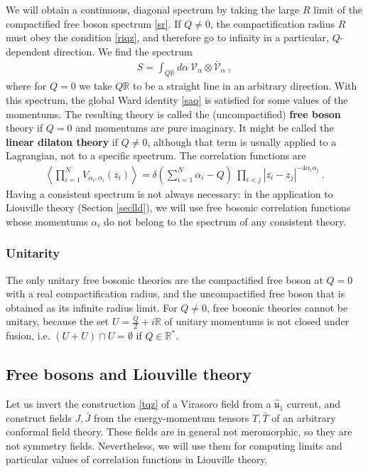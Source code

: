 \documentclass[12pt, a4paper, notitlepage, twoside]{report}
\numberwithin{equation}{section}
\theoremstyle{break}
\begin{document}
We will obtain a continuous, diagonal spectrum by taking 
the large $R$ limit of the compactified free boson spectrum \eqref{sr}.
If $Q\neq 0$, the compactification radius $R$ must obey the condition \eqref{riqz}, and therefore go to infinity in a particular, $Q$-dependent direction. We find the spectrum 
\begin{align}
 \boxed{ S = \int_{Q\mathbb{R}} d\alpha\ \mathcal{V}_\alpha\otimes \bar{\mathcal{V}}_\alpha}\ ,
\end{align}
where for $Q=0$ we take $Q\mathbb{R}$ to be a straight line in an arbitrary direction.  
With this spectrum, the global Ward identity \eqref{saq} is satisfied for some values of the momentums. 
The resulting theory is called the (uncompactified) \textbf{\boldmath free boson} theory if $Q=0$ and momentums are pure imaginary. It might be called the \textbf{\boldmath linear dilaton theory} if $Q\neq 0$, although that term is usually applied to a Lagrangian, not to a specific spectrum. 
The correlation functions are 
\begin{align}
 \left\langle \prod_{i=1}^N V_{\alpha_i,\alpha_i}(z_i)\right\rangle = \delta\left({\textstyle \sum}_{i=1}^N\alpha_i-Q\right)\ \prod_{i<j} |z_i-z_j|^{-4\alpha_i\alpha_j} \ .
\label{dpzz}
\end{align}
Having a consistent spectrum is not always necessary: in the application to Liouville theory (Section \ref{seclld}), we will use free bosonic correlation functions whose momentums $\alpha_i$ do not belong to the spectrum of any consistent theory.

\subsubsection{Unitarity}

The only unitary free bosonic theories are the compactified free boson at $Q=0$ with a real compactification radius, and the uncompactified free boson that is obtained as its infinite radius limit. For $Q\neq 0$, free bosonic theories cannot be unitary, because the set $U=\frac{Q}{2}+i\mathbb{R}$ of unitary momentums is not closed under fusion, i.e. $(U+U)\cap U = \emptyset$ if $Q\in \mathbb{R}^*$.


\subsection{Free bosons and Liouville theory \label{seclld}}

Let us invert the 
construction \eqref{tqz} of a Virasoro field from a $\hat{\mathfrak{u}}_1$ current, and construct fields $J,\bar J$ from the energy-momentum tensors $T,\bar T$ of an arbitrary conformal field theory. 
These fields are in general not meromorphic, so they are not symmetry fields.
Nevertheless, we will use them for computing limits and particular values of correlation functions in Liouville theory.
\end{document}
